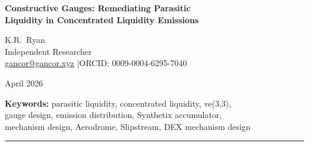 \documentclass[11pt,a4paper]{article}
\theoremstyle{cgdefinition}
\theoremstyle{cgplain}
\theoremstyle{cgremark}
\begin{document}
\thispagestyle{plain}

\begin{center}
{\LARGE\bfseries Constructive Gauges: Remediating Parasitic\\[4pt]
Liquidity in Concentrated Liquidity Emissions}

\vspace{12pt}
{\large K.R.\ Ryan}\\[4pt]
{\small Independent Researcher}\\[2pt]
{\small \href{mailto:gancor@gancor.xyz}{gancor@gancor.xyz} \quad|\quad ORCID: 0009-0004-6295-7040}

\vspace{8pt}
April 2026

\vspace{6pt}
{\small\textbf{Keywords:} parasitic liquidity, concentrated liquidity, ve(3,3),\\
gauge design, emission distribution, Synthetix accumulator,\\
mechanism design, Aerodrome, Slipstream, DEX mechanism design}
\end{center}

\vspace{8pt}
\hrule
\vspace{12pt}
\end{document}
